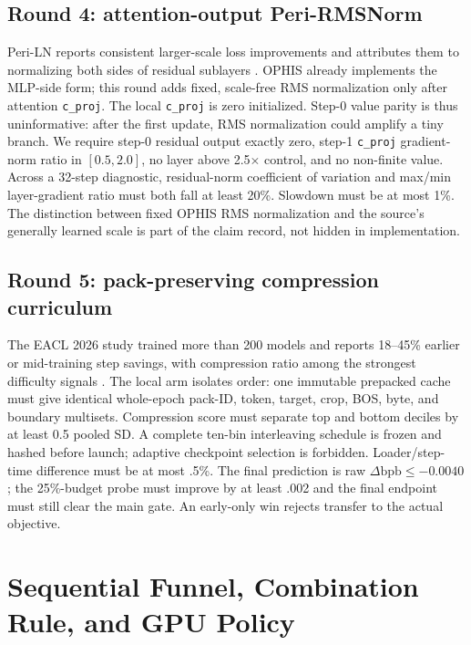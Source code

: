 \documentclass{article}
\newcommand{\bpb}{\mathrm{bpb}}
\begin{document}
\subsection{Round 4: attention-output Peri-RMSNorm}

Peri-LN reports consistent larger-scale loss improvements and attributes
them to normalizing both sides of residual sublayers
\cite{kim2025periln}.  OPHIS already implements the MLP-side form; this round
adds fixed, scale-free RMS normalization only after attention
\texttt{c\_proj}.  The local \texttt{c\_proj} is zero initialized.  Step-0
value parity is thus uninformative: after the first update, RMS normalization
could amplify a tiny branch.  We require step-0 residual output exactly zero,
step-1 \texttt{c\_proj} gradient-norm ratio in $[0.5,2.0]$, no layer above
2.5$\times$ control, and no non-finite value.  Across a 32-step diagnostic,
residual-norm coefficient of variation and max/min layer-gradient ratio must
both fall at least 20\%.  Slowdown must be at most 1\%.  The distinction
between fixed OPHIS RMS normalization and the source's generally learned
scale is part of the claim record, not hidden in implementation.

\subsection{Round 5: pack-preserving compression curriculum}

The EACL 2026 study trained more than 200 models and reports 18--45\% earlier
or mid-training step savings, with compression ratio among the strongest
difficulty signals \cite{zhang2026curriculum}.  The local arm isolates order:
one immutable prepacked cache must give identical whole-epoch pack-ID, token,
target, crop, BOS, byte, and boundary multisets.  Compression score must
separate top and bottom deciles by at least 0.5 pooled SD.  A complete ten-bin
interleaving schedule is frozen and hashed before launch; adaptive checkpoint
selection is forbidden.  Loader/step-time difference must be at most .5\%.
The final prediction is raw $\Delta\bpb\leq-0.0040$; the 25\%-budget probe
must improve by at least .002 and the final endpoint must still clear the
main gate.  An early-only win rejects transfer to the actual objective.

\section{Sequential Funnel, Combination Rule, and GPU Policy}
\end{document}
